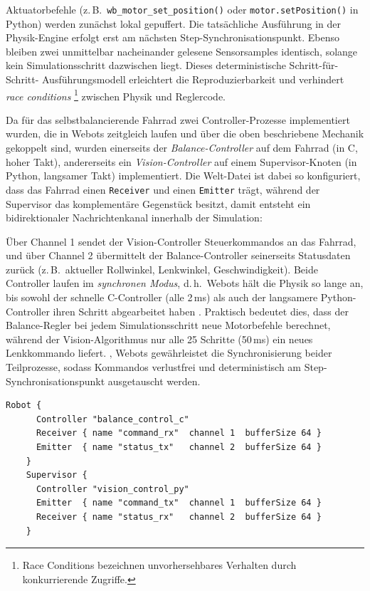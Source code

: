   
  Aktuatorbefehle (z.\,B.\ \texttt{wb\_motor\_set\_position()} oder \texttt{motor.setPosition()} in Python) werden zunächst lokal 
  gepuffert. Die tatsächliche Ausführung in der Physik\mbox{-}Engine erfolgt erst am nächsten Step-Synchronisationspunkt. 
   Ebenso bleiben zwei unmittelbar nacheinander gelesene Sensorsamples identisch, solange kein Simulationsschritt dazwischen liegt. 
   Dieses deterministische Schritt\mbox{-}für\mbox{-}Schritt\mbox{-} Ausführungsmodell erleichtert die Reproduzierbarkeit und 
   verhindert \emph{race conditions} \footnote{Race Conditions bezeichnen unvorhersehbares Verhalten durch konkurrierende Zugriffe.} zwischen Physik und Reglercode.

  Da für das selbstbalancierende Fahrrad zwei Controller-Prozesse implementiert wurden, die in Webots zeitgleich laufen und 
  über die oben beschriebene Mechanik gekoppelt sind, wurden einerseits der \emph{Balance\mbox{-}Controller} auf dem Fahrrad (in C, hoher Takt), 
  andererseits ein \emph{Vision\mbox{-}Controller} auf einem Supervisor\mbox{-}Knoten (in Python, langsamer Takt) implementiert. 
  Die Welt-Datei ist dabei so konfiguriert, dass das Fahrrad einen \texttt{Receiver} und einen \texttt{Emitter} trägt, während der Supervisor das komplementäre 
  Gegenstück besitzt, damit entsteht ein bidirektionaler Nachrichtenkanal innerhalb der Simulation:

  Über Channel 1 sendet der Vision-Controller Steuerkommandos an das Fahrrad, 
  und über Channel 2 übermittelt der Balance-Controller seinerseits Statusdaten zurück (z.\,B.\ aktueller Rollwinkel, Lenkwinkel, 
  Geschwindigkeit). Beide Controller laufen im \emph{synchronen Modus}, d.\,h.\ Webots hält die Physik so lange an, bis sowohl der 
  schnelle C-Controller (alle 2\,ms) als auch der langsamere Python-Controller ihren Schritt abgearbeitet haben \citep{cyberbotics_emitter}\citep{cyberbotics_receiver}. 
  Praktisch bedeutet dies, dass der Balance\mbox{-}Regler bei jedem Simulationsschritt neue Motorbefehle berechnet, während der
  Vision\mbox{-}Algorithmus nur alle 25 Schritte (50\,ms) ein neues Lenkkommando liefert. ‚
  Webots gewährleistet die Synchronisierung beider Teilprozesse, sodass Kommandos verlustfrei und deterministisch am 
  Step\mbox{-}Synchronisationspunkt ausgetauscht werden.


  
  \begin{lstlisting}[style=wbt_c,caption={Nachrichtenkanal zwischen Controller und Simulation \texttt{*.wbt}},label={lst:imu4}]
    Robot {
      Controller "balance_control_c"
      Receiver { name "command_rx"  channel 1  bufferSize 64 }
      Emitter  { name "status_tx"   channel 2  bufferSize 64 }
    }
    Supervisor {
      Controller "vision_control_py"
      Emitter  { name "command_tx"  channel 1  bufferSize 64 }
      Receiver { name "status_rx"   channel 2  bufferSize 64 }
    }
  \end{lstlisting}

